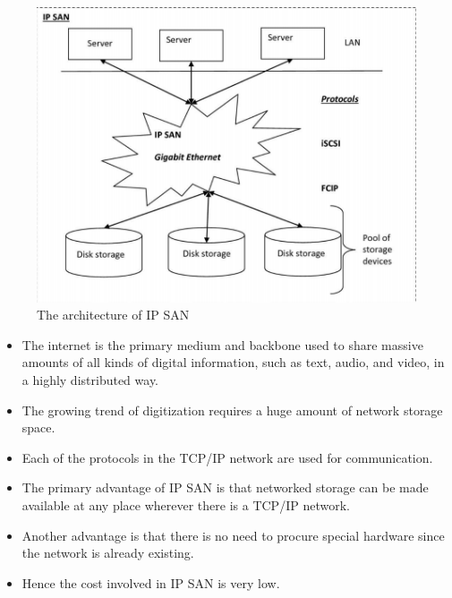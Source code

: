 \documentclass[a4paper, 12pt]{article}
\begin{document}
\begin{figure}[H]
	\centering
	\includegraphics[width=\linewidth]{ip_san_architecture.png}
  	\caption{The architecture of IP SAN}
	\label{fig:ip_san_architecture}
\end{figure}

\begin{itemize}
\item
The internet is the primary medium and backbone used to share massive amounts of all kinds of digital information, such as text, audio, and video, in a highly distributed way.
\item
The growing trend of digitization requires a huge amount of network storage space. 
\item
Each of the protocols in the TCP/IP network are used for communication.
\item
The primary advantage of IP SAN is that networked storage can be made available at any place wherever there is a TCP/IP network.
\item
Another advantage is that there is no need to procure special hardware since the network is already existing.
\item
Hence the cost involved in IP SAN is very low.
\end{itemize}
\end{document}
